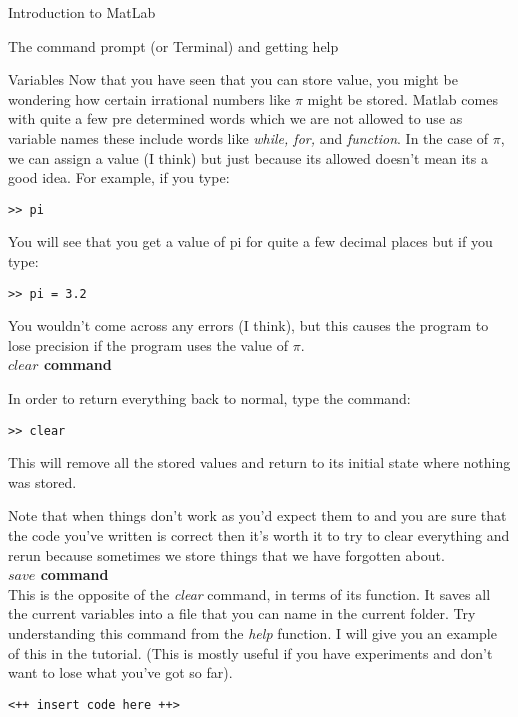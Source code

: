 \documentclass[11pt, oneside]{report}   	%
\begin{document}
\begin{chapter}{Introduction to MatLab}
\begin{section}{The command prompt (or Terminal) and getting help}
\begin{subsection}{Variables}
Now that you have seen that you can store value, you might be wondering how certain irrational numbers like $\pi$ might be stored. Matlab comes with quite a few pre determined words which we are not allowed to use as variable names these include words like \textit{while, for,} and \textit{function}. In the case of $\pi$, we can assign a value (I think) but just because its allowed doesn't mean its a good idea. For example, if you type:

\begin{lstlisting}
>> pi
\end{lstlisting}

You will see that you get a value of pi for quite a few decimal places but if you type:

\begin{lstlisting}
>> pi = 3.2
\end{lstlisting}
You wouldn't come across any errors (I think), but this causes the program to lose precision if the program uses the value of $\pi$. 
\\

\textbf{$clear$ command}

In order to return everything back to normal, type the command:

\begin{lstlisting}
>> clear
\end{lstlisting}

This will remove all the stored values and return to its initial state where nothing was stored. 

Note that when things don't work as you'd expect them to and you are sure that the code you've written is correct then it's worth it to try to clear everything and rerun because
sometimes we store things that we have forgotten about.
\\

\textbf{$save$ command}\\ 


This is the opposite of the \textit{clear} command, in terms of its function. It saves all the current variables into a file that you can name in the current folder. Try understanding this command from the \textit{help} function. I will give you an example of this in the tutorial. (This is mostly useful if you have experiments and don't want to lose what you've got so far).

\begin{lstlisting}
<++ insert code here ++>
\end{lstlisting}

\end{subsection}

\end{section}
\end{chapter}
\end{document}
